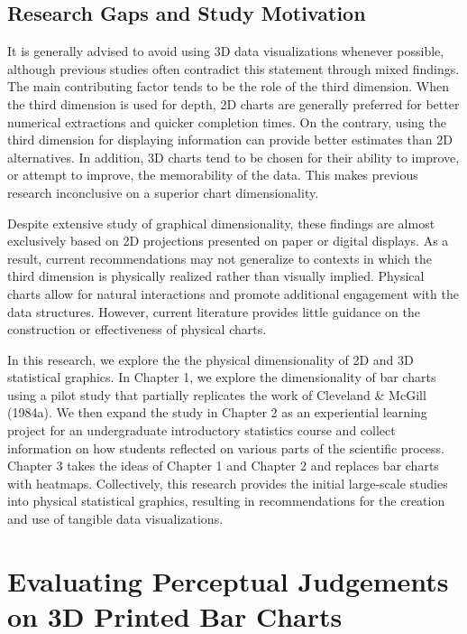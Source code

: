 \documentclass[phd]{nuthesis}
\begin{document}
\section{Research Gaps and Study
Motivation}\label{research-gaps-and-study-motivation}

It is generally advised to avoid using 3D data visualizations whenever
possible, although previous studies often contradict this statement
through mixed findings. The main contributing factor tends to be the
role of the third dimension. When the third dimension is used for depth,
2D charts are generally preferred for better numerical extractions and
quicker completion times. On the contrary, using the third dimension for
displaying information can provide better estimates than 2D
alternatives. In addition, 3D charts tend to be chosen for their ability
to improve, or attempt to improve, the memorability of the data. This
makes previous research inconclusive on a superior chart dimensionality.

Despite extensive study of graphical dimensionality, these findings are
almost exclusively based on 2D projections presented on paper or digital
displays. As a result, current recommendations may not generalize to
contexts in which the third dimension is physically realized rather than
visually implied. Physical charts allow for natural interactions and
promote additional engagement with the data structures. However, current
literature provides little guidance on the construction or effectiveness
of physical charts.

In this research, we explore the the physical dimensionality of 2D and
3D statistical graphics. In Chapter 1, we explore the dimensionality of
bar charts using a pilot study that partially replicates the work of
Cleveland \& McGill (1984a). We then expand the study in Chapter 2 as an
experiential learning project for an undergraduate introductory
statistics course and collect information on how students reflected on
various parts of the scientific process. Chapter 3 takes the ideas of
Chapter 1 and Chapter 2 and replaces bar charts with heatmaps.
Collectively, this research provides the initial large-scale studies
into physical statistical graphics, resulting in recommendations for the
creation and use of tangible data visualizations.


\chapter{Evaluating Perceptual Judgements on 3D Printed Bar
Charts}\label{evaluating-perceptual-judgements-on-3d-printed-bar-charts}
\end{document}
